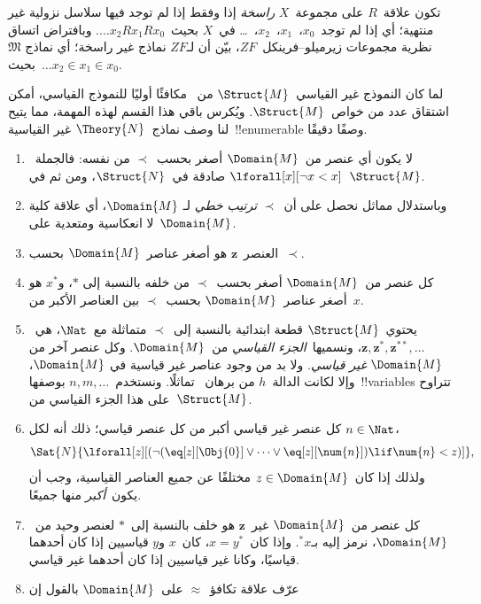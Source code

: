 \documentclass[../../../include/open-logic-section]{subfiles}
\begin{document}
\begin{prob}
تكون علاقة~$R$ على مجموعة~$X$ \emph{راسخة} إذا وفقط إذا لم توجد فيها
سلاسل نزولية غير منتهية؛ أي إذا لم توجد~$x_0$،~$x_1$،~$x_2$،~\dots
في~$X$ بحيث~$\dots x_2Rx_1Rx_0$. وبافتراض اتساق نظرية مجموعات
زيرميلو--فرينكل~$ZF$، بيّن أن لـ$ZF$ نماذج غير راسخة؛ أي نماذج
$\mathfrak{M}$ بحيث~$\dots x_2 \in x_1 \in x_0$.
\end{prob}

لما كان النموذج غير القياسي~$\Struct{M}$ من~
مكافئًا أوليًا للنموذج القياسي، أمكن اشتقاق عدد من خواص~$\Struct{M}$.
ويُكرس باقي هذا القسم لهذه المهمة، مما يتيح لنا وصف نماذج~$\Theory{N}$
غير القياسية~!!{enumerable} وصفًا دقيقًا.

\begin{enumerate}
\item لا يكون أي عنصر من~$\Domain{M}$ أصغر بحسب~$\prec$ من نفسه:
  فالجملة~$\lforall[x][\lnot x < x]$ صادقة في~$\Struct{N}$، ومن ثم
  في~$\Struct{M}$.
\item وباستدلال مماثل نحصل على أن~$\prec$ \emph{ترتيب خطي} لـ
  $\Domain{M}$، أي علاقة كلية لا انعكاسية ومتعدية على~$\Domain{M}$.
\item العنصر~$\mathbf{z}$ هو أصغر عناصر~$\Domain{M}$ بحسب~$\prec$.
\item كل عنصر من~$\Domain{M}$ أصغر بحسب~$\prec$ من خلفه بالنسبة إلى
  $*$، و$x^*$ هو أصغر عناصر~$\Domain{M}$ بحسب~$\prec$ بين العناصر
  الأكبر من~$x$.
\item يحتوي~$\Struct{M}$ قطعة ابتدائية بالنسبة إلى~$\prec$ متماثلة
  مع~$\Nat$، هي~$\mathbf{z}, \mathbf{z}^*, \mathbf{z}^{**}, \dots$،
  ونسميها~\emph{الجزء القياسي} من~$\Domain{M}$. وكل عنصر آخر من
  $\Domain{M}$ \emph{غير قياسي}. ولا بد من وجود عناصر غير قياسية في
  $\Domain{M}$، وإلا لكانت الدالة~$h$ من برهان~
  تماثلًا. ونستخدم~$n, m, \dots$ بوصفها~!!{variable}s تتراوح على هذا
  الجزء القياسي من~$\Struct{M}$.
\item كل عنصر غير قياسي أكبر من كل عنصر قياسي؛ ذلك أنه لكل
  $n \in \Nat$،
  \[
  \Sat{N}{\lforall[z][(\lnot(\eq[z][\Obj{0}] \lor
  \dots \lor \eq[z][\num{n}]) \lif \num{n} < z)]},
  \]
  ولذلك إذا كان~$z \in \Domain{M}$ مختلفًا عن جميع العناصر القياسية،
  وجب أن يكون~\emph{أكبر} منها جميعًا.
\item كل عنصر من~$\Domain{M}$ غير~$\mathbf{z}$ هو خلف بالنسبة إلى~$*$
  لعنصر وحيد من~$\Domain{M}$، نرمز إليه بـ$^*x$. وإذا كان~$x = y^*$،
  كان~$x$ و$y$ قياسيين إذا كان أحدهما قياسيًا، وكانا غير قياسيين إذا
  كان أحدهما غير قياسي.
\item عرّف علاقة تكافؤ~$\approx$ على~$\Domain{M}$ بالقول إن

\end{enumerate}
\end{document}

